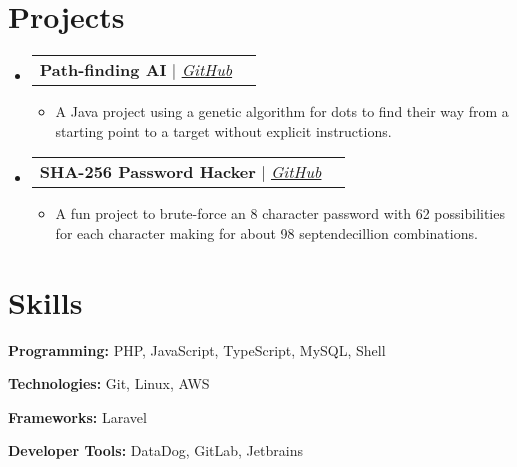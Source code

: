 \documentclass[letterpaper,11pt]{article}
\makeatletter
\newcommand{\resumeItem}[1]{
    \item\small{
            {#1 \vspace{-2pt}}
    }
}
\newcommand{\resumeProjectHeading}[2]{
    \vspace{-2pt}\item
    \begin{tabular*}{0.97\textwidth}{l@{\extracolsep{\fill}}r}
    \small#1 & #2 \\
    \end{tabular*}\vspace{-7pt}
}
\newcommand{\resumeSubHeadingListStart}{\begin{itemize}[leftmargin=0.15in, label={}]}
\newcommand{\resumeSubHeadingListEnd}{\end{itemize}}
\newcommand{\resumeItemListStart}{\begin{itemize}}
\newcommand{\resumeItemListEnd}{\end{itemize}\vspace{-5pt}}
\makeatother
\begin{document}


    \section{Projects}
    \vspace{3pt}
    \resumeSubHeadingListStart{}

    \resumeProjectHeading%
    {\textbf{Path-finding AI} $|$ \emph{\href{https://github.com/josephkerkhof/path-finding-ai}{\color{blue}GitHub}}}{}
    \resumeItemListStart{}
    \resumeItem{A Java project using a genetic algorithm for dots to find their way from a starting point to a target without explicit instructions.}
    \resumeItemListEnd{}

    \resumeProjectHeading%
    {\textbf{SHA-256 Password Hacker} $|$ \emph{\href{https://github.com/josephkerkhof/SHA-256-Password-Hacker}{\color{blue}GitHub}}}{}
    \resumeItemListStart{}
    \resumeItem{A fun project to brute-force an 8 character password with 62 possibilities for each character making for about 98 septendecillion combinations.}
    \resumeItemListEnd{}

    \resumeSubHeadingListEnd{}




    \section{Skills}
    \vspace{2pt}
    \resumeSubHeadingListStart{}
    \small{\item{%
        \textbf{Programming:} {PHP, JavaScript, TypeScript, MySQL, Shell} \\ \vspace{3pt}

        \textbf{Technologies:} {Git, Linux, AWS} \\ \vspace{3pt}

        \textbf{Frameworks:} {Laravel} \\ \vspace{3pt}

        \textbf{Developer Tools:} {DataDog, GitLab, Jetbrains} \\ \vspace{3pt}

    }}
    \resumeSubHeadingListEnd{}


\end{document}
